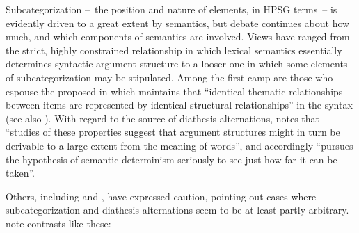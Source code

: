 \documentclass[output=paper
 	        ,biblatex
                ,babelshorthands
                ,newtxmath
                ,draftmode
                ,colorlinks, citecolor=brown
]{langscibook}
\begin{document}
Subcategorization --~the position and nature of \argst elements, in HPSG terms~-- is evidently driven to a great extent by semantics,
but debate continues about how much, and which components of semantics are involved.
Views have ranged from the strict, highly constrained relationship in which lexical semantics essentially determines syntactic argument structure to a looser one in which some elements of subcategorization may be stipulated.
Among  the first camp are those who espouse the   proposed in \citet[46]{Baker1988}\add{,} which maintains that ``identical thematic relationships between items are represented by identical structural relationships'' in the syntax (see also \citealt{Baker1997}).
With regard to the source of diathesis alternations,
\citet[12--13]{Levin1993} notes that ``studies of these properties suggest that argument structures
might in turn be derivable to a large extent from the meaning of words'', and accordingly ``pursues
the hypothesis of semantic determinism seriously to see just how far it can be taken''. 

Others, including \citet[Section~5.3]{pollard+sag:1987} and \citet[Section~5.1]{Davis2001}, have
expressed caution, pointing out cases where subcategorization and diathesis
alternations seem to be at least partly arbitrary. \citet[ex.\ 214--215]{pollard+sag:1987} note contrasts like these:
\end{document}
